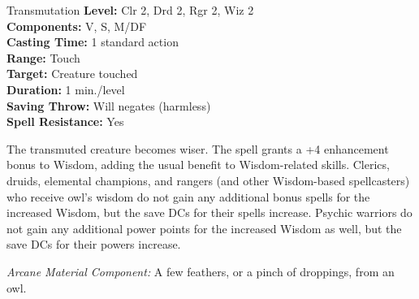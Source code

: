 {Transmutation}
{
	\textbf{Level:}
	Clr 2, Drd 2, Rgr 2, Wiz 2\\
	\textbf{Components:}
	V, S, M/DF\\
	\textbf{Casting Time:}
	1 standard action\\
	\textbf{Range:}
	Touch\\
	\textbf{Target:}
	Creature touched\\
	\textbf{Duration:}
	1 min./level\\
	\textbf{Saving Throw:}
	Will negates (harmless)\\
	\textbf{Spell Resistance:}
	Yes\\
}
{
	The transmuted creature becomes wiser. The spell grants a +4 enhancement bonus to Wisdom, adding the usual benefit to Wisdom-related skills. Clerics, druids, elemental champions, and rangers (and other Wisdom-based spellcasters) who receive owl's wisdom do not gain any additional bonus spells for the increased Wisdom, but the save DCs for their spells increase. Psychic warriors do not gain any additional power points for the increased Wisdom as well, but the save DCs for their powers increase.

	\textit{Arcane Material Component:}
	A few feathers, or a pinch of droppings, from an owl.

}
